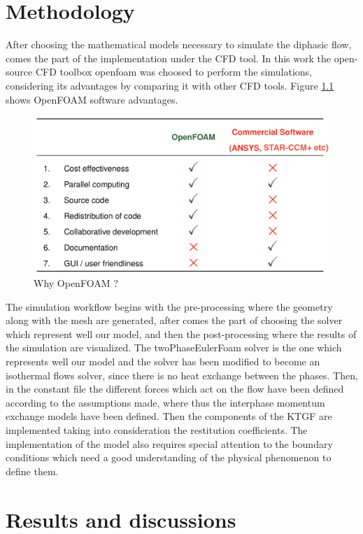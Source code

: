 \documentclass[11pt]{report}
\begin{document}
 \chapter{Methodology}
 After choosing the mathematical models necessary to simulate the diphasic flow, comes the part of the implementation under the CFD tool. 
 In this work the open-source CFD toolbox openfoam was choosed to perform the simulations, considering its advantages by comparing it with other CFD tools.
  Figure \ref{openfoam} shows OpenFOAM software advantages.\\
\begin{figure}[ht!]
 \begin{center}
 \includegraphics[trim=0cm 0cm 0cm 0cm,clip,scale=0.45]{figs/0F2.png}
 \caption{ Why OpenFOAM ?}
 \label{openfoam}
 \end{center}
 \end{figure} 
 The simulation workflow begins with the pre-processing where the geometry along with the mesh are generated, 
 after comes the part of choosing the solver which represent well our model, and then the post-processing where the results of the simulation are visualized.
%
The twoPhaseEulerFoam solver is the one which represents well our model and  the solver has been modified to become an isothermal flows solver, since there is no heat exchange between the phases. 
%
Then, in the constant file the different forces which act on the flow have been defined according to the assumptions made, where thus the interphase momentum exchange models have been defined.
%
 Then the components of the KTGF are implemented taking into consideration the restitution coefficients. 
 The implementation of the model also requires special attention to the boundary conditions which need a good understanding of the physical phenomenon to define them.
 \chapter{Results and discussions} \label{results}
\end{document}
